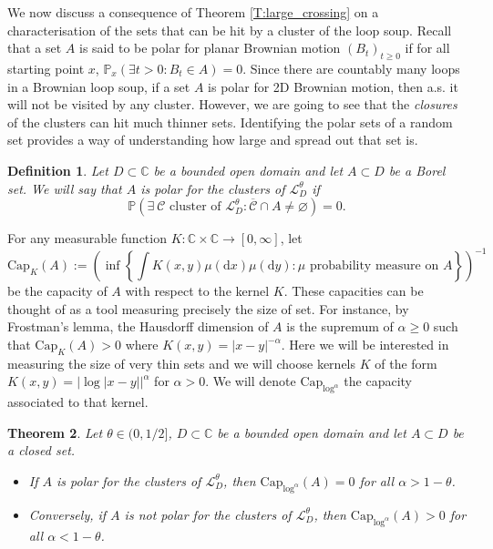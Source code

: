 \documentclass[11pt]{article}
\newtheorem{theorem}{Theorem}[section]
\newtheorem{definition}[theorem]{Definition}
\theoremstyle{remark}
\newcommand{\C}{\mathbb{C}}
\newcommand{\Cc}{\mathcal{C}}
\newcommand{\Lc}{\mathcal{L}}
\newcommand{\Prob}[1]{\mathbb{P} \left( #1 \right) }
\newcommand{\PROB}[2]{\mathbb{P}_{#1} \left( #2 \right) }
\renewcommand{\d}{\mathrm{d}}
\renewcommand{\Cap}{\mathrm{Cap}}
\numberwithin{equation}{section}
\begin{document}
\medskip

We now discuss a consequence of Theorem \ref{T:large_crossing} on a characterisation of the sets that can be hit by a cluster of the loop soup. Recall that a set $A$ is said to be polar for planar Brownian motion $(B_t)_{t \geq 0}$ if for all starting point $x$,
$
\PROB{x}{\exists t>0: B_t \in A} = 0.
$
Since there are countably many loops in a Brownian loop soup, if a set $A$ is polar for 2D Brownian motion, then a.s. it will not be visited by any cluster. However, we are going to see that the \emph{closures} of the clusters can hit much thinner sets.
Identifying the polar sets of a random set provides a way of understanding how large and spread out that set is.

\begin{definition}
Let $D \subset \C$ be a bounded open domain and let $A \subset D$ be a Borel set. We will say that $A$ is polar for the clusters of $\Lc_D^\theta$ if
\[
\Prob{ \exists~ \Cc \text{~cluster~of~} \Lc_D^\theta: \overline{\Cc} \cap A \neq \varnothing } = 0.
\]
\end{definition}

For any measurable function $K : \C \times \C \to [0,\infty]$, let
\begin{equation}
\Cap_{K}(A) := \left( \inf \left\{ \int K(x,y) \mu(\d x) \mu(\d y): \mu \text{~probability~measure~on~} A \right\} \right)^{-1}
\end{equation}
be the capacity of $A$ with respect to the kernel $K$. These capacities can be thought of as a tool measuring precisely the size of set. For instance, by Frostman's lemma, the Hausdorff dimension of $A$ is the supremum of $\alpha \geq 0$ such that $\Cap_K(A) >0$ where $K(x,y) = |x-y|^{-\alpha}$. Here we will be interested in measuring the size of very thin sets and we will choose kernels $K$ of the form $K(x,y) = |\log |x-y||^\alpha$ for $\alpha >0$. We will denote $\Cap_{\log^\alpha}$ the capacity associated to that kernel.


\begin{theorem}\label{T:polar}
Let $\theta \in (0,1/2]$, $D \subset \C$ be a bounded open domain and let $A \subset D$ be a closed set.
\begin{itemize}
\item
If $A$ is polar for the clusters of $\Lc_D^\theta$, then $\Cap_{\log^\alpha}(A) = 0$ for all $\alpha > 1-\theta$.
\item
Conversely, if $A$ is not polar for the clusters of $\Lc_D^\theta$, then $\Cap_{\log^\alpha}(A) > 0$ for all $\alpha < 1-\theta$.
\end{itemize}
\end{theorem}
\end{document}

